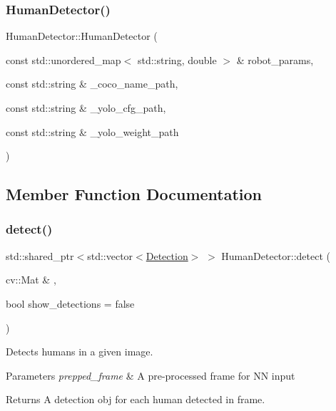 \subsubsection{\texorpdfstring{Human\+Detector()}{HumanDetector()}}
{\footnotesize\ttfamily Human\+Detector\+::\+Human\+Detector (\begin{DoxyParamCaption}\item[{const std\+::unordered\+\_\+map$<$ std\+::string, double $>$ \&}]{robot\+\_\+params,  }\item[{const std\+::string \&}]{\+\_\+coco\+\_\+name\+\_\+path,  }\item[{const std\+::string \&}]{\+\_\+yolo\+\_\+cfg\+\_\+path,  }\item[{const std\+::string \&}]{\+\_\+yolo\+\_\+weight\+\_\+path }\end{DoxyParamCaption})\hspace{0.3cm}{\ttfamily [inline]}}



\subsection{Member Function Documentation}
\mbox{\label{class_human_detector_ad63edaf628fd5fd819cfebfc5ce90466}} 
\subsubsection{\texorpdfstring{detect()}{detect()}}
{\footnotesize\ttfamily std\+::shared\+\_\+ptr$<$std\+::vector$<$\hyperlink{struct_detection}{Detection}$>$ $>$ Human\+Detector\+::detect (\begin{DoxyParamCaption}\item[{cv\+::\+Mat \&}]{,  }\item[{bool}]{show\+\_\+detections = {\ttfamily false} }\end{DoxyParamCaption})}



Detects humans in a given image. 


\begin{DoxyParams}{Parameters}
{\em prepped\+\_\+frame} & A pre-\/processed frame for NN input \\
\hline
\end{DoxyParams}
\begin{DoxyReturn}{Returns}
A detection obj for each human detected in frame. 
\end{DoxyReturn}
\mbox{\label{class_human_detector_a806bd77dc446642911093a6a1b1a6bf7}} 
